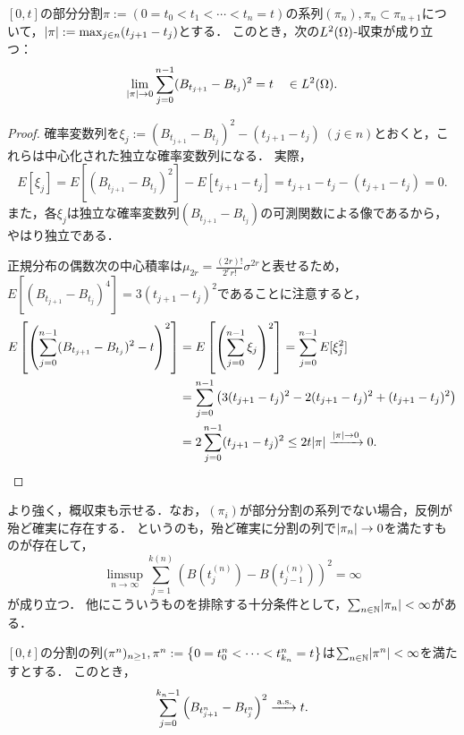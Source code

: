 \documentclass[uplatex,dvipdfmx]{jsreport}
\begin{document}
\begin{proposition}[2次変動の$L^2$-収束]
    $[0,t]$の部分分割$\pi:=(0=t_0<t_1<\cdots<t_n=t)$の系列$(\pi_n),\pi_n\subset\pi_{n+1}$について，$\lvert\pi\rvert:=\max_{j\in n}(t_{j+1}-t_j)$とする．
    このとき，次の$L^2(\Omega)$-収束が成り立つ：
    \[\lim_{\lvert\pi\rvert\to0}\sum^{n-1}_{j=0}(B_{t_{j+1}}-B_{t_j})^2=t\quad\in L^2(\Omega).\]
\end{proposition}
\begin{proof}
    確率変数列を$\xi_j:=(B_{t_{j+1}}-B_{t_j})^2-(t_{j+1}-t_j)\;(j\in n)$とおくと，これらは中心化された独立な確率変数列になる．
    実際，
    \[E[\xi_j]=E[(B_{t_{j+1}}-B_{t_j})^2]-E[t_{j+1}-t_j]=t_{j+1}-t_j-(t_{j+1}-t_j)=0.\]
    また，各$\xi_j$は独立な確率変数列$(B_{t_{j+1}}-B_{t_j})$の可測関数による像であるから，やはり独立である．
    
    正規分布の偶数次の中心積率は$\mu_{2r}=\frac{(2r)!}{2^rr!}\sigma^{2r}$と表せるため，$E[(B_{t_{j+1}}-B_{t_j})^4]=3(t_{j+1}-t_j)^2$であることに注意すると，
    \begin{align*}
        E\left[\left(\sum^{n-1}_{j=0}(B_{t_{j+1}}-B_{t_j})^2-t\right)^2\right]&=E\left[\left(\sum^{n-1}_{j=0}\xi_j\right)^2\right]=\sum^{n-1}_{j=0}E[\xi^2_j]\\
        &=\sum^{n-1}_{j=0}\left(3(t_{j+1}-t_j)^2-2(t_{j+1}-t_j)^2+(t_{j+1}-t_j)^2\right)\\
        &=2\sum^{n-1}_{j=0}(t_{j+1}-t_j)^2\le 2t\lvert\pi\rvert\xrightarrow{\lvert\pi\rvert\to0}0.
    \end{align*}
\end{proof}
\begin{remark}
    より強く，概収束も示せる．なお，$(\pi_i)$が部分分割の系列でない場合，反例が殆ど確実に存在する．
    というのも，殆ど確実に分割の列で$\lvert\pi_n\rvert\to 0$を満たすものが存在して，
    \[\limsup_{n\to\infty}\sum^{k(n)}_{j=1}(B(t_j^{(n)})-B(t^{(n)}_{j-1}))^2=\infty\]
    が成り立つ．
    他にこういうものを排除する十分条件として，$\sum_{n\in\mathbb{N}}\lvert\pi_n\rvert<\infty$がある．
\end{remark}

\begin{proposition}[2次変動の概収束]
    $[0,t]$の分割の列$(\pi^n)_{n\ge 1},\pi^n:=\left\{0=t^n_0<\cdots<t^n_{k_n}=t\right\}$は$\sum_{n\in\mathbb{N}}\lvert\pi^n\rvert<\infty$を満たすとする．
    このとき，
    \[\sum^{k_n-1}_{j=0}\left(B_{t^n_{j+1}}-B_{t^n_j}\right)^2\xrightarrow{\;\mathrm{a.s.}}t.\]
\end{proposition}
\end{document}
